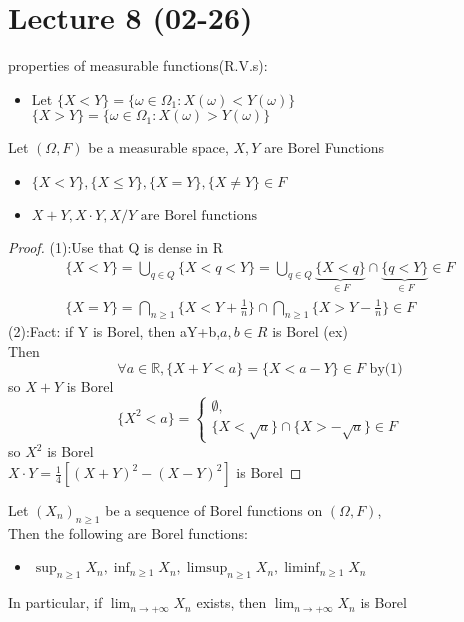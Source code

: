\section{Lecture 8 (02-26)}
properties of measurable functions(R.V.s):
\begin{itemize}
\item Let $\{X<Y\}=\{\omega\in \Omega_1:X(\omega)<Y(\omega)\}$\\
$\{X>Y\}=\{\omega\in \Omega_1:X(\omega)>Y(\omega)\}$
\end{itemize}
\begin{lemma}[]{}
    Let $ (\Omega ,F) $ be a measurable space, $ X,Y $ are Borel Functions
\begin{itemize}
\item $\{X<Y\},\{X\leq Y\},\{X=Y\},\{X\neq Y\}\in F$
\item $X+Y,X\cdot Y,X/Y \text{ are Borel functions}$
\end{itemize}
\end{lemma}
\begin{proof}
(1):Use that Q is dense in R\begin{align*}{}{}
    \{X<Y\}=\bigcup_{q\in Q}\{X<q<Y\}= \bigcup_{q\in Q}\underbrace{\{X<q\}}_{\in F}\cap\underbrace{\{q<Y\}}_{\in F}\in F\\
    \{X=Y\}=\bigcap_{n\geq 1}\{X<Y+\frac{1}{n}\}\cap\bigcap_{n\geq 1}\{X>Y-\frac{1}{n}\}\in F
\end{align*}
(2):Fact: if Y is Borel, then aY+b,$ a,b\in R $ is Borel (ex)
\\Then $$
    \forall a\in \mathbb{R}, \{X+Y<a\}=\{X<a-Y\}\in F \text{ by(1)}
$$  so $ X+Y $ is Borel
$$
    \{X^2<a\}=\begin{cases}
        \emptyset, \\
        \{X<\sqrt{a}\}\cap\{X>-\sqrt{a}\} \in F
    \end{cases}
$$ so $ X^2 $ is Borel
\\$ X\cdot Y=\frac{1}{4}[(X+Y)^2-(X-Y)^2] $ is Borel
\end{proof}
\begin{lemma}[]{}
Let $ (X_n)_{n\geq1} $ be a sequence of Borel functions on $ (\Omega,F) $, \\Then the following are Borel functions:
\begin{itemize}
\item $ \sup_{n\geq1}X_n,\inf_{n\geq1}X_n,\limsup_{n\geq1}X_n,\liminf_{n\geq1}X_n $
\end{itemize} 
In particular, if $ \lim_{n\rightarrow+\infty}X_n $ exists, then $ \lim_{n\rightarrow+\infty}X_n $ is Borel 
\end{lemma}
